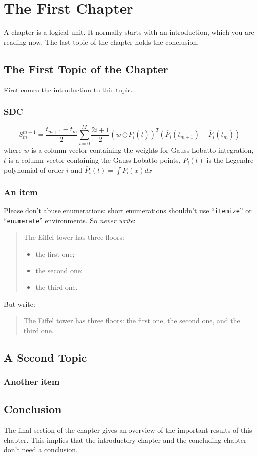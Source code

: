 \chapter{The First Chapter}
\label{cha:1}
A chapter is a logical unit. It normally starts with an introduction, which
you are reading now. The last topic of the chapter holds the conclusion.

\section{The First Topic of the Chapter}
First comes the introduction to this topic.

\lipsum[55]

\subsection{SDC}
\[S^{m+1}_{m} = \frac{t_{m+1}-t_m}{2}\sum_{i=0}^M \frac{2i+1}{2}(w\odot P_i(\overline{t}))^T (\overline{P}_i(\overline{t}_{m+1}) - \overline{P}_i(\overline{t}_{m}))\]
where $w$ is a column vector containing the weights for Gauss-Lobatto integration, $\overline{t}$ is a column vector containing the Gauss-Lobatto points, $P_i(t)$ is the Legendre polynomial of order $i$ and $\overline{P}_i(t) = \int P_i(x)dx$

\subsection{An item}
Please don't abuse enumerations: short enumerations shouldn't use
``\verb|itemize|'' or ``\texttt{enumerate}'' environments.
So \emph{never write}: 
\begin{quote}
  The Eiffel tower has three floors:
  \begin{itemize}
  \item the first one;
  \item the second one;
  \item the third one.
  \end{itemize}
\end{quote}
But write:
\begin{quote}
  The Eiffel tower has three floors: the first one, the second one, and the
  third one.
\end{quote}

\section{A Second Topic}
\lipsum[64]

\subsection{Another item}
\lipsum[56-57]

\section{Conclusion}
The final section of the chapter gives an overview of the important results
of this chapter. This implies that the introductory chapter and the
concluding chapter don't need a conclusion.

\lipsum[66]

